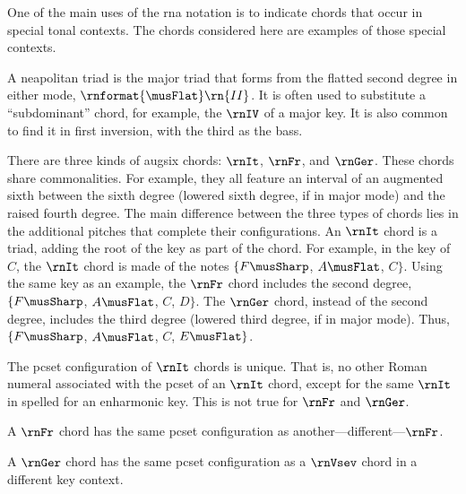
One of the main uses of the \gls{rna} notation is to
indicate chords that occur in special tonal contexts. The
chords considered here are examples of those special
contexts.


A \gls{neapolitan} triad is the major triad that forms from
the flatted second degree in either mode,
$\rnformat{\musFlat}\rn{II}$. It is often used to substitute
a ``subdominant'' chord, for example, the $\rnIV$ of a major
key. It is also common to find it in first inversion, with
the third as the bass.


There are three kinds of \gls{augsix} chords: $\rnIt$,
$\rnFr$, and $\rnGer$. These chords share commonalities. For
example, they all feature an interval of an augmented sixth
between the sixth degree (lowered sixth degree, if in major
mode) and the raised fourth degree. The main difference
between the three types of chords lies in the additional
pitches that complete their configurations. An $\rnIt$ chord
is a triad, adding the root of the key as part of the chord.
For example, in the key of $C$, the $\rnIt$ chord is made of
the notes $\{F\musSharp$, $A\musFlat$, $C\}$. Using the same
key as an example, the $\rnFr$ chord includes the second
degree, $\{F\musSharp$, $A\musFlat$, $C$, $D\}$. The
$\rnGer$ chord, instead of the second degree, includes the
third degree (lowered third degree, if in major mode). Thus,
$\{F\musSharp$, $A\musFlat$, $C$, $E\musFlat\}$.

The \gls{pcset} configuration of $\rnIt$ chords is unique.
That is, no other Roman numeral associated with the
\gls{pcset} of an $\rnIt$ chord, except for the same $\rnIt$
in spelled for an enharmonic key. This is not true for
$\rnFr$ and $\rnGer$. 

A $\rnFr$ chord has the same \gls{pcset} configuration as
another---different---$\rnFr$.

A $\rnGer$ chord has the same \gls{pcset} configuration as a
$\rnVsev$ chord in a different key context.
